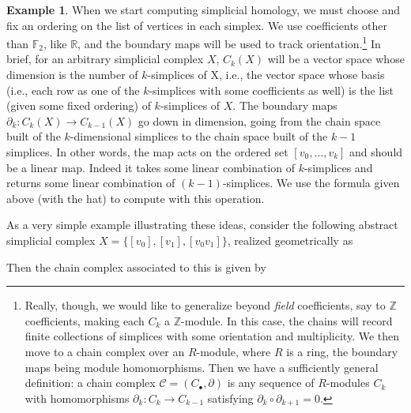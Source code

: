 \documentclass[11pt]{book}
\theoremstyle{definition}
\newtheorem{example}{Example}[section]
\theoremstyle{definition}
\theoremstyle{definition}
\theoremstyle{theorem}
\theoremstyle{definition}
\begin{document}
\begin{example}
	When we start computing simplicial homology, we must choose and fix an ordering on the list of vertices in each simplex. We use coefficients other than $\mathbb{F}_2$, like $\mathbb{R}$, and the boundary maps will be used to track orientation.\footnote{Really, though, we would like to generalize beyond \textit{field} coefficients, say to $\mathbb{Z}$ coefficients, making each $C_k$ a $\mathbb{Z}$-module. In this case, the chains will record finite collections of simplices with some orientation and multiplicity. We then move to a chain complex over an $R$-module, where $R$ is a ring, the boundary maps being module homomorphisms. Then we have a sufficiently general definition: a chain complex $\mathscr{C} = (C_{\bullet}, \partial)$ is any sequence of $R$-modules $C_k$ with homomorphisms $\partial_k: C_k \rightarrow C_{k-1}$ satisfying $\partial_k \circ \partial_{k+1} = 0$.} In brief, for an arbitrary simplicial complex $X$, $C_k (X)$ will be a vector space whose dimension is the number of $k$-simplices of X, i.e., the vector space whose basis (i.e., each row as one of the $k$-simplices with some coefficients as well) is the list (given some fixed ordering) of $k$-simplices of $X$. The boundary maps $\partial_k: C_k(X) \rightarrow C_{k-1}(X)$ go down in dimension, going from the chain space built of the $k$-dimensional simplices to the chain space built of the $k-1$ simplices. In other words, the map acts on the ordered set $[v_0,\dots,v_k]$ and should be a linear map.  Indeed it takes some linear combination of $k$-simplices and returns some linear combination of $(k-1)$-simplices. We use the formula given above (with the hat) to compute with this operation.\par 
	As a very simple example illustrating these ideas, consider the following abstract simplicial complex $X = \{[v_0],[v_1],[v_0v_1]\}$, realized geometrically as 
		\begin{center} 
			 \end{center} \par \noindent 
	Then the chain complex associated to this is given by 
	\par 

\end{example}
\end{document}
